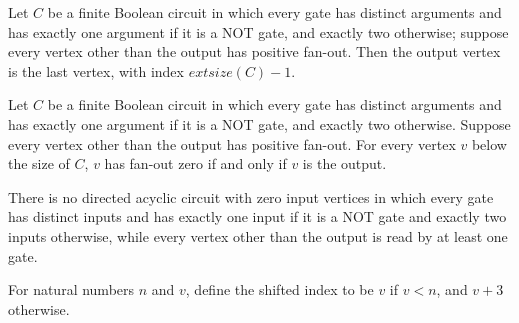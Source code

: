 \begin{theorem}
\label{BoolCircuit.DAGCircuit.IsStrict.output_eq}
\leanok
{}
Let $C$ be a finite Boolean circuit in which every gate has distinct arguments and has
exactly one argument if it is a NOT gate, and exactly two otherwise; suppose every
vertex other than the output has positive fan-out. Then the output vertex is the last
vertex, with index $	ext{size}(C)-1$.
\end{theorem}

\begin{theorem}
\label{BoolCircuit.DAGCircuit.IsStrict.fanout_eq_zero_iff}
\leanok
{}
Let $C$ be a finite Boolean circuit in which every gate has distinct arguments and has
exactly one argument if it is a NOT gate, and exactly two otherwise. Suppose every
vertex other than the output has positive fan-out. For every vertex $v$ below the size
of $C$, $v$ has fan-out zero if and only if $v$ is the output.
\end{theorem}

\begin{theorem}
\label{BoolCircuit.DAGCircuit.not_isStrict_zero}
\leanok
{}
There is no directed acyclic circuit with zero input vertices in which every gate has
distinct inputs and has exactly one input if it is a NOT gate and exactly two inputs
otherwise, while every vertex other than the output is read by at least one gate.
\end{theorem}

\begin{definition}
\label{BoolCircuit.shiftPrefix}
\leanok
For natural numbers $n$ and $v$, define the shifted index to be $v$ if $v<n$, and $v+3$
otherwise.
\end{definition}

